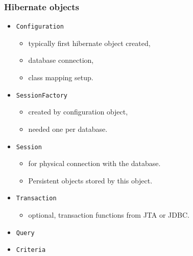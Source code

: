 \documentclass[10pt,xcolor=pdflatex]{beamer}
\begin{document}
\begin{frame}\frametitle{Hibernate objects}
	\begin{itemize}
		\item \texttt{Configuration}
          \begin{itemize}
        	\item typically first hibernate object created,
        	\item database connection,
        	\item class mapping setup.
          \end{itemize}
        \item \texttt{SessionFactory}
          \begin{itemize}
        	\item created by configuration object,
        	\item needed one per database.
          \end{itemize}
		\item \texttt{Session}
          \begin{itemize}
        	\item for physical connection with the database.
			\item Persistent objects stored by this object.
          \end{itemize}
		\item \texttt{Transaction}
          \begin{itemize}
        	\item optional, transaction functions from JTA or JDBC.
          \end{itemize}
		\item \texttt{Query}
        \item \texttt{Criteria}
	\end{itemize}
\end{frame}
\end{document}
